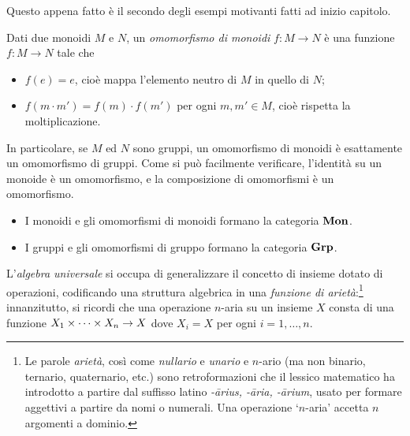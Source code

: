 Questo appena fatto è il secondo degli esempi motivanti fatti ad inizio capitolo.
\begin{example}\label{ex_cat_monoidi}
	Dati due monoidi \(M\) e \(N\), un \emph{omomorfismo di monoidi} \(f:M\to N\) è una funzione \(f:M\to N\) tale che
	\begin{itemize}
		\item \(f(e) = e\), cioè mappa l'elemento neutro di \(M\) in quello di \(N\);
		\item \(f(m\cdot m')=f(m)\cdot f(m')\) per ogni \(m,m'\in M\), cioè rispetta la moltiplicazione.
	\end{itemize}
	In particolare, se \(M\) ed \(N\) sono gruppi, un omomorfismo di monoidi è esattamente un omomorfismo di gruppi.
	Come si può facilmente verificare, l'identità su un monoide è un omomorfismo, e la composizione di omomorfismi è un omomorfismo.
	\begin{itemize}
		\item I monoidi e gli omomorfismi di monoidi formano la categoria \(\mathbf{Mon}\).
		\item I gruppi e gli omomorfismi di gruppo formano la categoria \(\mathbf{Grp}\).
	\end{itemize}
\end{example}
L'\emph{algebra universale} si occupa di generalizzare il concetto di insieme dotato di operazioni, codificando una struttura algebrica in una \emph{funzione di arietà}:\footnote{Le parole \emph{arietà}, così come \emph{nullario} e \emph{unario} e \(n\)-ario (ma non binario, ternario, quaternario, etc.) sono retroformazioni che il lessico matematico ha introdotto a partire dal suffisso latino \emph{-\={a}rius, -\=aria, -\=arium}, usato per formare aggettivi a partire da nomi o numerali. Una operazione `\(n\)-aria' accetta \(n\) argomenti a dominio.} innanzitutto, si ricordi che una operazione \(n\)-aria su un insieme \(X\) consta di una funzione \(\tup Xn\times \to X\) dove \(X_i = X\) per ogni \(i=1,\dots,n\).
